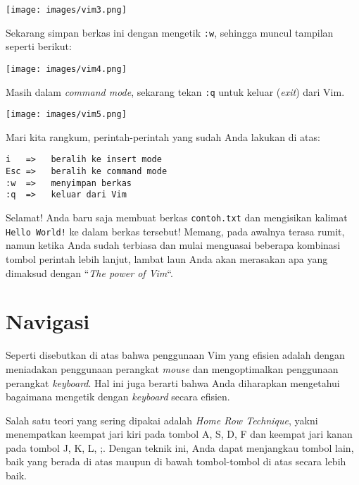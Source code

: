 \documentclass{article}
\begin{document}
\vspace{12pt}

\texttt{[image: images/vim3.png]}

\vspace{12pt}

Sekarang simpan berkas ini dengan mengetik \verb=:w=,
sehingga muncul tampilan seperti berikut:

\vspace{12pt}

\texttt{[image: images/vim4.png]}

\vspace{12pt}

Masih dalam \emph{command mode}, sekarang tekan \verb=:q=
untuk keluar (\emph{exit}) dari Vim.

\vspace{12pt}

\texttt{[image: images/vim5.png]}

\vspace{12pt}

Mari kita rangkum, perintah-perintah yang sudah Anda lakukan
di atas:

\begin{verbatim}
i   =>   beralih ke insert mode
Esc =>   beralih ke command mode
:w  =>   menyimpan berkas
:q  =>   keluar dari Vim
\end{verbatim}

Selamat! Anda baru saja membuat berkas \verb=contoh.txt= dan
mengisikan kalimat \verb=Hello World!= ke dalam berkas
tersebut! Memang, pada awalnya terasa rumit, namun ketika
Anda sudah terbiasa dan mulai menguasai beberapa kombinasi
tombol perintah lebih lanjut, lambat laun Anda akan merasakan apa
yang dimaksud dengan ``\emph{The power of Vim}``.

\section{Navigasi}
Seperti disebutkan di atas bahwa penggunaan Vim yang efisien
adalah dengan meniadakan penggunaan perangkat \emph{mouse}
dan mengoptimalkan penggunaan perangkat \emph{keyboard}. Hal
ini juga berarti bahwa Anda diharapkan mengetahui bagaimana
mengetik dengan \emph{keyboard} secara efisien. 

Salah satu teori yang sering dipakai adalah \emph{Home Row
Technique}, yakni menempatkan keempat jari kiri pada tombol
A, S, D, F dan keempat jari kanan pada tombol J, K, L, ;.
Dengan teknik ini, Anda dapat menjangkau tombol lain, baik
yang berada di atas maupun di bawah tombol-tombol di atas
secara lebih baik.
\end{document}
